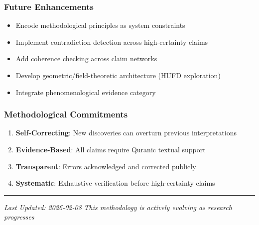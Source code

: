 \documentclass[12pt,a4paper]{article}
\providecommand{\tightlist}{\setlength{\itemsep}{0pt}\setlength{\parskip}{0pt}}
\begin{document}
\subsubsection{Future Enhancements}\label{future-enhancements}

\begin{itemize}
\tightlist
\item
  Encode methodological principles as system constraints
\item
  Implement contradiction detection across high-certainty claims
\item
  Add coherence checking across claim networks
\item
  Develop geometric/field-theoretic architecture (HUFD exploration)
\item
  Integrate phenomenological evidence category
\end{itemize}

\subsubsection{Methodological
Commitments}\label{methodological-commitments}

\begin{enumerate}
\def\labelenumi{\arabic{enumi}.}
\tightlist
\item
  \textbf{Self-Correcting}: New discoveries can overturn previous
  interpretations
\item
  \textbf{Evidence-Based}: All claims require Quranic textual support
\item
  \textbf{Transparent}: Errors acknowledged and corrected publicly
\item
  \textbf{Systematic}: Exhaustive verification before high-certainty
  claims
\end{enumerate}

\begin{center}\rule{0.5\linewidth}{0.5pt}\end{center}

\emph{Last Updated: 2026-02-08} \emph{This methodology is actively
evolving as research progresses}
\end{document}
